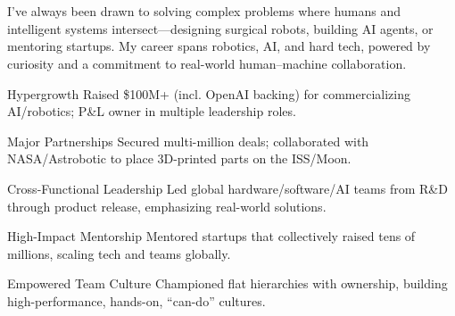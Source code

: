 \documentclass[11pt, letterpaper]{awesome-cv}
\begin{document}
\makecvheader

\begin{cvparagraph}
\\
\\
I've always been drawn to solving complex problems where humans and intelligent systems intersect—designing surgical robots, building AI agents, or mentoring startups. My career spans robotics, AI, and hard tech, powered by curiosity and a commitment to real-world human–machine collaboration.
\end{cvparagraph}

\begin{cvskills}

\cvskill
{Hypergrowth}
{Raised \$100M+ (incl. OpenAI backing) for commercializing AI/robotics; P\&L owner in multiple leadership roles.}

\cvskill
{Major Partnerships}
{Secured multi-million deals; collaborated with NASA/Astrobotic to place 3D-printed parts on the ISS/Moon.}

\cvskill
{Cross-Functional Leadership}
{Led global hardware/software/AI teams from R\&D through product release, emphasizing real-world solutions.}

\cvskill
{High-Impact Mentorship}
{Mentored startups that collectively raised tens of millions, scaling tech and teams globally.}

\cvskill
{Empowered Team Culture}
{Championed flat hierarchies with ownership, building high-performance, hands-on, “can-do” cultures.}

\end{cvskills}
\end{document}
